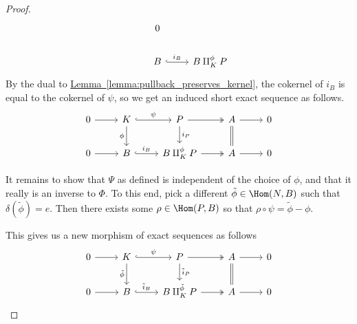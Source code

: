 \documentclass[main.tex]{subfiles}
\begin{document}
\begin{proof}
\begin{equation*}
\begin{tikzcd}
      & 0
      \\
      & B
      \arrow[r, hook, "i_{B}"]
      & B \amalg^{\phi}_{K} P
    \end{tikzcd}
  \end{equation*}
  By the dual to \hyperref[lemma:pullback_preserves_kernel]{Lemma~\ref*{lemma:pullback_preserves_kernel}}, the cokernel of $i_{B}$ is equal to the cokernel of $\psi$, so we get an induced short exact sequence as follows.
  \begin{equation*}
    \begin{tikzcd}
      0
      \arrow[r]
      & K
      \arrow[r, hook, "\psi"]
      \arrow[d, swap, "\phi"]
      & P
      \arrow[r, two heads]
      \arrow[d, "i_{P}"]
      & A
      \arrow[r]
      \arrow[d, equals]
      & 0
      \\
      0
      \arrow[r]
      & B
      \arrow[r, hook, "i_{B}"]
      & B \amalg^{\phi}_{K} P
      \arrow[r, two heads]
      & A
      \arrow[r]
      & 0
    \end{tikzcd}
  \end{equation*}
  
  It remains to show that $\Psi$ as defined is independent of the choice of $\phi$, and that it really is an inverse to $\Phi$. To this end, pick a different $\tilde{\phi} \in \Hom(N, B)$ such that $\delta(\tilde{\phi}) = e$. Then there exists some $\rho \in \Hom(P, B)$ so that $\rho \circ \psi = \tilde{\phi} - \phi$.

  This gives us a new morphism of exact sequences as follows
  \begin{equation}
    \label{eq:exact_seq_for_phi_tilde}
    \begin{tikzcd}
      0
      \arrow[r]
      & K
      \arrow[r, hook, "\psi"]
      \arrow[d, swap, "\tilde{\phi}"]
      & P
      \arrow[r, two heads]
      \arrow[d, "\tilde{i}_{P}"]
      & A
      \arrow[r]
      \arrow[d, equals]
      & 0
      \\
      0
      \arrow[r]
      & B
      \arrow[r, hook, "\tilde{i}_{B}"]
      & B \amalg^{\tilde{\phi}}_{K} P
      \arrow[r, two heads]
      & A
      \arrow[r]
      & 0
    \end{tikzcd}
  \end{equation}


\end{proof}
\end{document}
